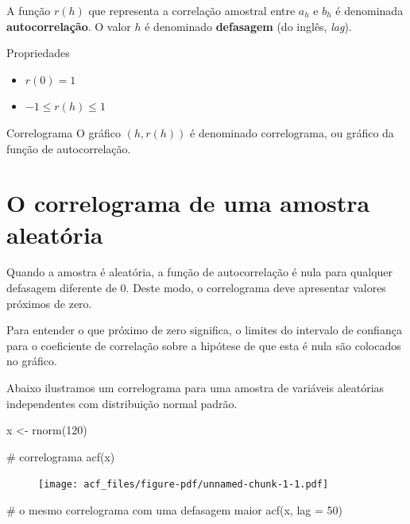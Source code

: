 \documentclass[
  letterpaper,
  DIV=11,
  numbers=noendperiod]{scrreprt}
\newenvironment{Shaded}{\begin{snugshade}}{\end{snugshade}}
\newcommand{\AttributeTok}[1]{\textcolor[rgb]{0.40,0.45,0.13}{#1}}
\newcommand{\CommentTok}[1]{\textcolor[rgb]{0.37,0.37,0.37}{#1}}
\newcommand{\DecValTok}[1]{\textcolor[rgb]{0.68,0.00,0.00}{#1}}
\newcommand{\FunctionTok}[1]{\textcolor[rgb]{0.28,0.35,0.67}{#1}}
\newcommand{\NormalTok}[1]{\textcolor[rgb]{0.00,0.23,0.31}{#1}}
\newcommand{\OtherTok}[1]{\textcolor[rgb]{0.00,0.23,0.31}{#1}}
\begin{document}
A função \(r(h)\) que representa a correlação amostral entre \(a_h\) e
\(b_h\) é denominada \textbf{autocorrelação}. O valor \(h\) é denominado
\textbf{defasagem} (do inglês, \emph{lag}).

Propriedades

\begin{itemize}
\item
  \(r(0)=1\)
\item
  \(-1\leq r(h) \leq 1\)
\end{itemize}

Correlograma O gráfico \((h,r(h))\) é denominado correlograma, ou
gráfico da função de autocorrelação.

\hypertarget{o-correlograma-de-uma-amostra-aleatuxf3ria}{%
\section{O correlograma de uma amostra
aleatória}\label{o-correlograma-de-uma-amostra-aleatuxf3ria}}

Quando a amostra é aleatória, a função de autocorrelação é nula para
qualquer defasagem diferente de 0. Deste modo, o correlograma deve
apresentar valores próximos de zero.

Para entender o que próximo de zero significa, o limites do intervalo de
confiança para o coeficiente de correlação sobre a hipótese de que esta
é nula são colocados no gráfico.

Abaixo ilustramos um correlograma para uma amostra de variáveis
aleatórias independentes com distribuição normal padrão.

\begin{Shaded}
\begin{Highlighting}[]
\NormalTok{x }\OtherTok{\textless{}{-}} \FunctionTok{rnorm}\NormalTok{(}\DecValTok{120}\NormalTok{)}

\CommentTok{\# correlograma}
\FunctionTok{acf}\NormalTok{(x)}
\end{Highlighting}
\end{Shaded}

\begin{figure}[H]

{\centering \texttt{[image: acf\_files/figure-pdf/unnamed-chunk-1-1.pdf]}

}

\end{figure}

\begin{Shaded}
\begin{Highlighting}[]
\CommentTok{\# o mesmo correlograma com uma defasagem maior}
\FunctionTok{acf}\NormalTok{(x, }\AttributeTok{lag =} \DecValTok{50}\NormalTok{)}
\end{Highlighting}
\end{Shaded}
\end{document}
